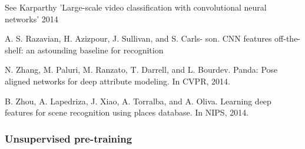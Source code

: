 See Karparthy 'Large-scale video classification with convolutional neural networks' 2014

A. S. Razavian, H. Azizpour, J. Sullivan, and S. Carls-
son. CNN features off-the-shelf: an astounding baseline for
recognition

N. Zhang, M. Paluri, M. Ranzato, T. Darrell, and L. Bourdev. Panda: Pose aligned networks for deep attribute modeling. In CVPR, 2014.

B. Zhou, A. Lapedriza, J. Xiao, A. Torralba, and A. Oliva. Learning deep features for scene recognition using places database. In NIPS, 2014.
\subsubsection{Unsupervised pre-training}
